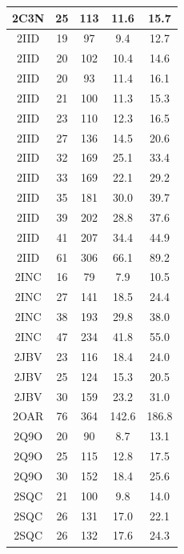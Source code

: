 \begin{table}
\begin{tabular}{||c | c c c c||}
        \hline
        2C3N & 25 & 113 & 11.6 & 15.7 \\
        \hline
        2IID & 19 & 97 & 9.4 & 12.7 \\
        \hline
        2IID & 20 & 102 & 10.4 & 14.6 \\
        \hline
        2IID & 20 & 93 & 11.4 & 16.1 \\
        \hline
        2IID & 21 & 100 & 11.3 & 15.3 \\
        \hline
        2IID & 23 & 110 & 12.3 & 16.5 \\
        \hline
        2IID & 27 & 136 & 14.5 & 20.6 \\
        \hline
        2IID & 32 & 169 & 25.1 & 33.4 \\
        \hline
        2IID & 33 & 169 & 22.1 & 29.2 \\
        \hline
        2IID & 35 & 181 & 30.0 & 39.7 \\
        \hline
        2IID & 39 & 202 & 28.8 & 37.6 \\
        \hline
        2IID & 41 & 207 & 34.4 & 44.9 \\
        \hline
        2IID & 61 & 306 & 66.1 & 89.2 \\
        \hline
        2INC & 16 & 79 & 7.9 & 10.5 \\
        \hline
        2INC & 27 & 141 & 18.5 & 24.4 \\
        \hline
        2INC & 38 & 193 & 29.8 & 38.0 \\
        \hline
        2INC & 47 & 234 & 41.8 & 55.0 \\
        \hline
        2JBV & 23 & 116 & 18.4 & 24.0 \\
        \hline
        2JBV & 25 & 124 & 15.3 & 20.5 \\
        \hline
        2JBV & 30 & 159 & 23.2 & 31.0 \\
        \hline
        2OAR & 76 & 364 & 142.6 & 186.8 \\
        \hline
        2Q9O & 20 & 90 & 8.7 & 13.1 \\
        \hline
        2Q9O & 25 & 115 & 12.8 & 17.5 \\
        \hline
        2Q9O & 30 & 152 & 18.4 & 25.6 \\
        \hline
        2SQC & 21 & 100 & 9.8 & 14.0 \\
        \hline
        2SQC & 26 & 131 & 17.0 & 22.1 \\
        \hline
        2SQC & 26 & 132 & 17.6 & 24.3 \\
        \hline

\end{tabular}
\end{table}
